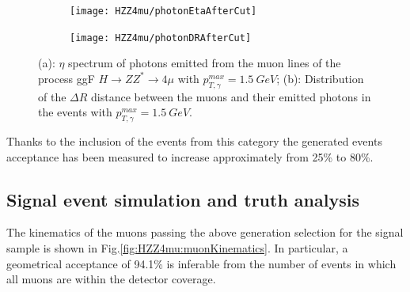 \documentclass[a4paper,twoside,12pt]{article}
\begin{document}
\begin{figure}
\centering
\begin{subfigure}{.5\textwidth}
  \centering
  \texttt{[image: HZZ4mu/photonEtaAfterCut]}
  \caption{}
  \label{fig:HZZ4mu:photonEtaAfterCut}
\end{subfigure}%
\begin{subfigure}{.5\textwidth}
  \centering
  \texttt{[image: HZZ4mu/photonDRAfterCut]}
  \caption{}
  \label{fig:HZZ4mu:photonDRAfterCut}
\end{subfigure}
\caption{(a): $\eta$ spectrum of photons emitted from the muon lines of the process 
	ggF $H \rightarrow ZZ^* \rightarrow 4\mu$ with $p^{max}_{T, \gamma} = 1.5\ GeV$; 
	(b): Distribution of the $\Delta R$ distance between the muons and their emitted photons in the events with $p^{max}_{T, \gamma} = 1.5\ GeV$.}
\label{fig:HZZ4mu:genPhotonsAfterCut}
\end{figure}

Thanks to the inclusion of the events from this category the generated events acceptance has been measured to increase approximately from 25\% to 80\%.\\

\subsection{Signal event simulation and truth analysis}

The kinematics of the muons passing the above generation selection for the 
signal sample is shown in 
Fig.\ref{fig:HZZ4mu:muonKinematics}. In particular, a geometrical acceptance of 94.1\%
is inferable from the number of events in which all muons are within the detector
coverage.\\
\end{document}
